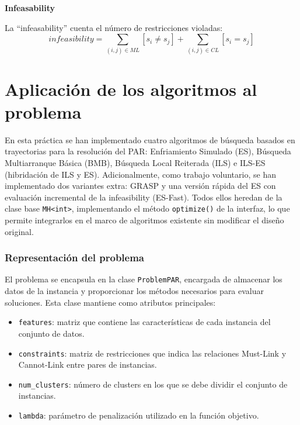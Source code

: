 \documentclass[a4paper,12pt]{article}%
\begin{document}
\vspace{0.1cm}
\noindent\textbf{Infeasability}

La ``infeasability'' cuenta el número de restricciones violadas:
\begin{equation*}
	infeasibility = \sum_{(i,j) \in ML} [s_i \neq s_j] + \sum_{(i,j) \in CL} [s_i = s_j]
\end{equation*}



\newpage
\section{Aplicación de los algoritmos al problema}

\noindent En esta práctica se han implementado cuatro algoritmos de búsqueda basados en trayectorias para la resolución del PAR: Enfriamiento Simulado (ES), Búsqueda Multiarranque Básica (BMB), Búsqueda Local Reiterada (ILS) e ILS-ES (hibridación de ILS y ES). Adicionalmente, como trabajo voluntario, se han implementado dos variantes extra: GRASP y una versión rápida del ES con evaluación incremental de la infeasibility (ES-Fast). Todos ellos heredan de la clase base \texttt{MH<int>}, implementando el método \texttt{optimize()} de la interfaz, lo que permite integrarlos en el marco de algoritmos existente sin modificar el diseño original.


\subsubsection*{Representación del problema}

\noindent El problema se encapsula en la clase \texttt{ProblemPAR}, encargada de almacenar los datos de la instancia y proporcionar los métodos necesarios para evaluar soluciones. Esta clase mantiene como atributos principales:

\begin{itemize}
	\item \texttt{features}: matriz que contiene las características de cada instancia del conjunto de datos.
	\item \texttt{constraints}: matriz de restricciones que indica las relaciones Must-Link y Cannot-Link entre pares de instancias.
	\item \texttt{num\_clusters}: número de clusters en los que se debe dividir el conjunto de instancias.
	\item \texttt{lambda}: parámetro de penalización utilizado en la función objetivo.
\end{itemize}
\end{document}
